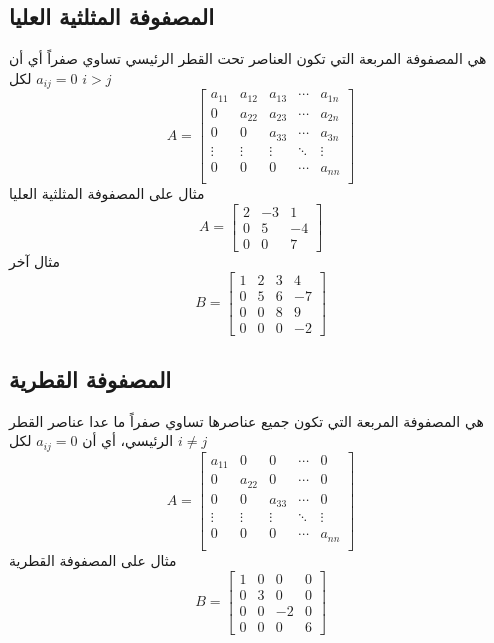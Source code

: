 	\subsection{المصفوفة المثلثية العليا}
	هي المصفوفة المربعة التي تكون العناصر تحت القطر الرئيسي تساوي صفراً أي أن  
	$a_{ij} = 0$ لكل $i > j$
	\[
	A =
	\begin{bmatrix}
		a_{11} & a_{12} & a_{13} & \cdots & a_{1n}\\
		0 & a_{22} & a_{23} & \cdots & a_{2n}\\
		0 & 0 & a_{33} & \cdots & a_{3n}\\
		\vdots & \vdots & \vdots & \ddots & \vdots\\
		0 & 0 & 0 & \cdots & a_{nn}\\
	\end{bmatrix}
	\]
	مثال على المصفوفة المثلثية العليا
	\[
	A=
	\begin{bmatrix}
		2&-3&1\\
		0&5&-4\\
		0&0&7
	\end{bmatrix}
	\]
	مثال آخر
	\[
	B=
	\begin{bmatrix}
		1&2&3&4\\
		0&5&6&-7\\
		0&0&8&9\\
		0&0&0&-2
	\end{bmatrix}
	\]
	
	\subsection{المصفوفة القطرية}
	هي المصفوفة المربعة التي تكون جميع عناصرها تساوي صفراً ما عدا عناصر القطر الرئيسي، أي أن  
	$a_{ij} = 0$ لكل $i \neq j$
	\[
	A =
	\begin{bmatrix}
		a_{11} & 0 & 0 & \cdots & 0\\
		0 & a_{22} & 0 & \cdots & 0\\
		0 & 0 & a_{33} & \cdots & 0\\
		\vdots & \vdots & \vdots & \ddots & \vdots\\
		0 & 0 & 0 & \cdots & a_{nn}\\
	\end{bmatrix}
	\]
	مثال على المصفوفة القطرية
	\[
	B=
	\begin{bmatrix}
		1&0&0&0\\
		0&3&0&0\\
		0&0&-2&0\\
		0&0&0&6
	\end{bmatrix}
	\]
	
